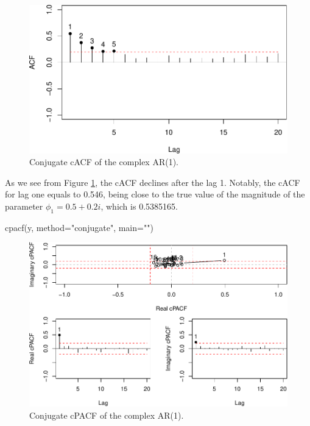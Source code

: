 \documentclass[
]{book}
\newenvironment{Shaded}{\begin{snugshade}}{\end{snugshade}}
\newcommand{\AttributeTok}[1]{\textcolor[rgb]{0.77,0.63,0.00}{#1}}
\newcommand{\FunctionTok}[1]{\textcolor[rgb]{0.00,0.00,0.00}{#1}}
\newcommand{\NormalTok}[1]{#1}
\newcommand{\StringTok}[1]{\textcolor[rgb]{0.31,0.60,0.02}{#1}}
\begin{document}
\begin{figure}
\centering
\includegraphics{Svetunkov---Svetunkov---Complex-Valued-Econometrics_files/figure-latex/complexAR1cACF-1.pdf}
\caption{\label{fig:complexAR1cACF}Conjugate cACF of the complex AR(1).}
\end{figure}

As we see from Figure \ref{fig:complexAR1cACF}, the cACF declines after the lag 1. Notably, the cACF for lag one equals to 0.546, being close to the true value of the magnitude of the parameter \(\phi_1=0.5+0.2i\), which is 0.5385165.

\begin{Shaded}
\begin{Highlighting}[]
\FunctionTok{cpacf}\NormalTok{(y, }\AttributeTok{method=}\StringTok{"conjugate"}\NormalTok{, }\AttributeTok{main=}\StringTok{""}\NormalTok{)}
\end{Highlighting}
\end{Shaded}

\begin{figure}
\centering
\includegraphics{Svetunkov---Svetunkov---Complex-Valued-Econometrics_files/figure-latex/complexAR1cPACF-1.pdf}
\caption{\label{fig:complexAR1cPACF}Conjugate cPACF of the complex AR(1).}
\end{figure}
\end{document}
